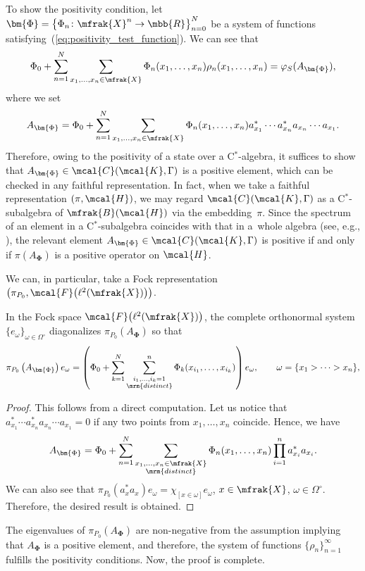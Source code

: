 To show the positivity condition, let $\bm{\Phi}=\big\{\Phi_{n}\colon\mfrak{X}^{n}\to\mbb{R}\big\}_{n=0}^{N}$ be a system of functions satisfying~(\ref{eq:positivity_test_function}).
We can see that
\begin{equation*}
	\Phi_{0}+\sum_{n=1}^{N}\sum_{x_{1},\dots, x_{n}\in\mfrak{X}}\Phi_{n}(x_{1},\dots, x_{n})\rho_{n}(x_{1},\dots, x_{n})
	=\varphi_{S} (A_{\bm{\Phi}} ),
\end{equation*}
where we set
\begin{equation*}
	A_{\bm{\Phi}}=\Phi_{0}+\sum_{n=1}^{N}\sum_{x_{1},\dots,x_{n}\in\mfrak{X}}\Phi_{n}(x_{1},\dots,x_{n})a_{x_{1}}^{\ast}\cdots a_{x_{n}}^{\ast}a_{x_{n}}\cdots a_{x_{1}}.
\end{equation*}
Therefore, owing to the positivity of a state over a C$^{\ast}$-algebra, it suffices to show that $A_{\bm{\Phi}}\in\mcal{C}(\mcal{K},\Gamma)$ is a positive element, which can be checked in any faithful representation. In fact, when we take a faithful representation $(\pi,\mcal{H})$, we may regard $\mcal{C}(\mcal{K},\Gamma)$ as a C$^{\ast}$-subalgebra of $\mfrak{B}(\mcal{H})$ via the embedding~$\pi$. Since the spectrum of an element in a C$^{\ast}$-subalgebra coincides with that in a~whole algebra (see, e.g., \cite[Proposition~2.2.7]{BratteliRobinson1987}), the relevant element $A_{\bm{\Phi}}\in\mcal{C}(\mcal{K},\Gamma)$ is positive if and only if $\pi \left(A_{\bm{\Phi}}\right)$ is a positive operator on $\mcal{H}$.

We can, in particular, take a Fock representation $\big(\pi_{P_{0}},\mcal{F}\big(\ell^{2}(\mfrak{X})\big)\big)$.
\begin{Lemma}
In the Fock space $\mcal{F}\big(\ell^{2}(\mfrak{X})\big)$, the complete orthonormal system $\{e_{\omega}\}_{\omega\in\Omega^{\circ}}$ diagonalizes $\pi_{P_{0}} (A_{\bm{\Phi}} )$ so that
\begin{equation*}
	\pi_{P_{0}}\left(A_{\bm{\Phi}}\right) e_{\omega}=\left(\Phi_{0}+\sum_{k=1}^{N}\sum_{\substack{i_{1},\dots,i_{k}=1\\ \mrm{distinct}}}^{n}\Phi_{k}(x_{i_{1}},\dots, x_{i_{k}})\right) e_{\omega},\qquad \omega=\{x_{1}>\cdots >x_{n}\},
\end{equation*}
\end{Lemma}
\begin{proof}
This follows from a direct computation.
Let us notice that $a_{x_{1}}^{\ast}\cdots a_{x_{n}}^{\ast}a_{x_{n}}\cdots a_{x_{1}}=0$ if any two points from $x_{1},\dots, x_{n}$ coincide. Hence, we have
\begin{equation*}
	A_{\bm{\Phi}}=\Phi_{0}+\sum_{n=1}^{N}\sum_{\substack{x_{1},\dots,x_{n}\in\mfrak{X}\\ \mrm{distinct}}}\Phi_{n}(x_{1},\dots,x_{n})\prod_{i=1}^{n}a_{x_{i}}^{\ast}a_{x_{i}}.
\end{equation*}
We can also see that $\pi_{P_{0}}(a_{x}^{\ast}a_{x})e_{\omega}=\chi_{[x\in\omega]}e_{\omega}$, $x\in\mfrak{X}$, $\omega\in\Omega^{\circ}$. Therefore, the desired result is obtained.
\end{proof}

The eigenvalues of $\pi_{P_{0}} (A_{\bm{\Phi}} )$ are non-negative from the assumption implying that $A_{\bm{\Phi}}$ is a positive element, and therefore, the system of functions $\{\rho_{n}\}_{n=1}^{\infty}$ fulfills the positivity conditions.
Now, the proof is complete.

